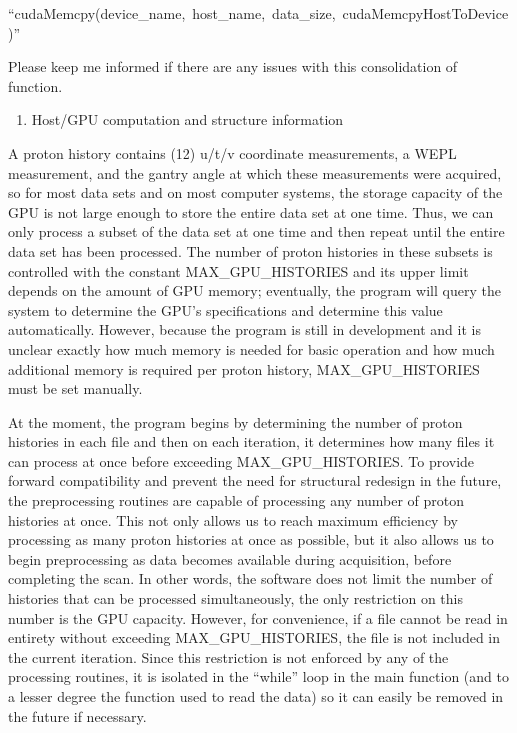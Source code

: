 \documentclass{article}
\begin{document}
\begin{center}
    \mbox{``cudaMemcpy(device\_name, host\_name, data\_size, cudaMemcpyHostToDevice)''}
\end{center}
Please keep me informed if there are any issues with this consolidation of function.
\begin{enumerate}[label = (\arabic*), leftmargin = 0.0cm, resume = section]
\bfseries
\item Host/GPU computation and structure information
\end{enumerate}
A proton history contains (12) u/t/v coordinate measurements, a WEPL measurement, and the gantry angle at which these measurements were acquired, so for most data sets and on most computer systems, the storage capacity of the GPU is not large enough to store the entire data set at one time.  Thus, we can only process a subset of the data set at one time and then repeat until the entire data set has been processed.  The number of proton histories in these subsets is controlled with the constant MAX\_GPU\_HISTORIES and its upper limit depends on the amount of GPU memory; eventually, the program will query the system to determine the GPU's specifications and determine this value automatically.  However, because the program is still in development and it is unclear exactly how much memory is needed for basic operation and how much additional memory is required per proton history, MAX\_GPU\_HISTORIES must be set manually.

At the moment, the program begins by determining the number of proton histories in each file and then on each iteration, it determines how many files it can process at once before exceeding MAX\_GPU\_HISTORIES.  To provide forward compatibility and prevent the need for structural redesign in the future, the preprocessing routines are capable of processing any number of proton histories at once.  This not only allows us to reach maximum efficiency by processing as many proton histories at once as possible, but it also allows us to begin preprocessing as data becomes available during acquisition, before completing the scan.  In other words, the software does not limit the number of histories that can be processed simultaneously, the only restriction on this number is the GPU capacity.  However, for convenience, if a file cannot be read in entirety without exceeding MAX\_GPU\_HISTORIES, the file is not included in the current iteration.  Since this restriction is not enforced by any of the processing routines, it is isolated in the ``while'' loop in the main function (and to a lesser degree the function used to read the data) so it can easily be removed in the future if necessary.
\end{document}

